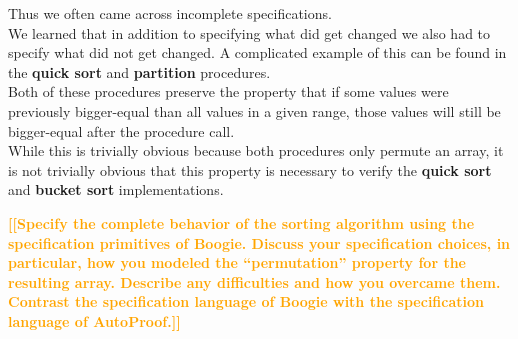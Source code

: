 \documentclass{report}
\newcommand{\todo}[1]{\textsf{\textbf{\textcolor{orange}{[[#1]]}}}}
\begin{document}
Thus we often came across incomplete specifications.\\
We learned that in addition to specifying what did get changed we also had to
specify what did not get changed. A complicated example of this can be found in
the \textbf{quick sort} and \textbf{partition} procedures.\\
Both of these procedures preserve the property that if some values were previously
bigger-equal than all values in a given range, those values will still be bigger-equal
after the procedure call.\\
While this is trivially obvious because both procedures only permute an array,
it is not trivially obvious that this property is necessary to verify the
\textbf{quick sort} and \textbf{bucket sort} implementations.

\todo{Specify the complete behavior of the sorting algorithm
using the specification primitives of Boogie. Discuss your specification choices, in
particular, how you modeled the “permutation” property for the resulting array.
Describe any difficulties and how you overcame them. Contrast the specification
language of Boogie with the specification language of AutoProof.}
\end{document}
